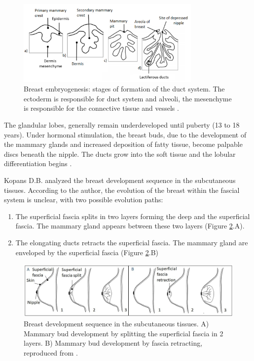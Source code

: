  \begin{figure}[!h]
 \centering
\includegraphics[width=0.8\textwidth,keepaspectratio]{figures/breast_evolution_my.png} 
\caption[Breast embryogenesis] {Breast embryogenesis: stages of formation of the duct system. The ectoderm is responsible for duct system and alveoli, the mesenchyme is responsible for the connective tissue and vessels \citep{skandalakis_embryology_2009}.}
\label{breastembryogenesis}
\end{figure}


The glandular lobes, generally remain underdeveloped until puberty (13 to 18 years). Under hormonal stimulation, the breast buds, due to the development of the mammary glands and increased deposition of fatty tissue, become palpable discs beneath the nipple. The ducts grow into the soft tissue and the lobular differentiation begins \citep{kopans2007breast}. 

Kopans D.B. \citep{kopans2007breast} analyzed the breast development sequence in the subcutaneous tissues. According to the author, the evolution of the breast within the fascial system is unclear, with two possible evolution paths: 
\begin{enumerate}[label=(\Alph*)]
\item The superficial fascia splits in two layers forming the deep and the superficial fascia. The mammary gland appears between these two layers (Figure \ref{breastevol_fascia}.A).
\item The elongating ducts retracts the superficial fascia.  The mammary gland are enveloped by the superficial fascia (Figure  \ref{breastevol_fascia}.B)
\end{enumerate}

\begin{figure}[!h]
\centering
\includegraphics[width=0.9\linewidth,keepaspectratio]{figures/breastEvol_fascia_my.jpg} 
\caption[Breast development sequence into subcutaneous tissues.]{Breast development sequence in the subcutaneous tissues. A) Mammary bud development by splitting the superficial fascia in 2 layers. B) Mammary bud development by fascia retracting, reproduced from  \citep{kopans2007breast}. }
\label{breastevol_fascia}
\end{figure}


